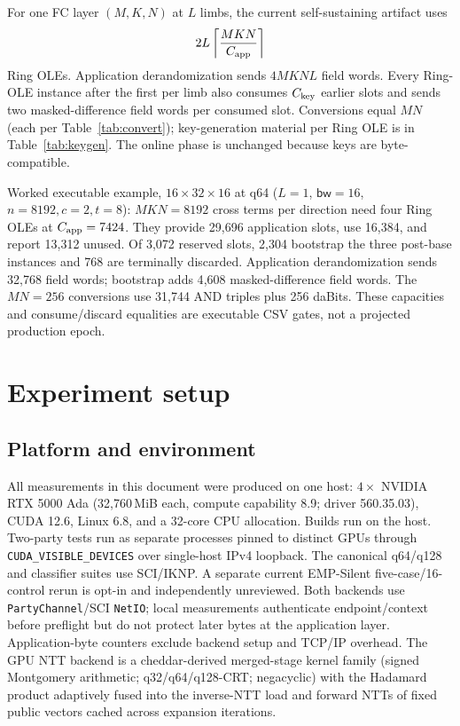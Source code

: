 \documentclass[11pt]{article}
\newcommand{\bw}{\mathsf{bw}}
\begin{document}
For one FC layer $(M,K,N)$ at $L$ limbs, the current self-sustaining artifact
uses
\[
2L\left\lceil\frac{MKN}{C_{\rm app}}\right\rceil
\]
Ring OLEs. Application derandomization sends $4MKNL$ field words. Every
Ring-OLE instance after the first per limb also consumes $C_{\rm key}$ earlier
slots and sends two masked-difference field words per consumed slot. Conversions
equal $MN$ (each per Table~\ref{tab:convert}); key-generation material per Ring
OLE is in Table~\ref{tab:keygen}. The online phase is unchanged because keys
are byte-compatible.

Worked executable example, $16{\times}32{\times}16$ at q64 ($L{=}1$,
$\bw{=}16$, $n{=}8192,c{=}2,t{=}8$): $MKN=8192$ cross terms per direction
need four Ring OLEs at $C_{\rm app}=7424$. They provide 29{,}696 application
slots, use 16{,}384, and report 13{,}312 unused. Of 3{,}072 reserved slots,
2{,}304 bootstrap the three post-base instances and 768 are terminally
discarded. Application derandomization sends 32{,}768 field words; bootstrap
adds 4{,}608 masked-difference field words. The $MN=256$ conversions use
31{,}744 AND triples plus 256 daBits. These capacities and consume/discard
equalities are executable CSV gates, not a projected production epoch.

\section{Experiment setup}
\label{sec:experiments}

\subsection{Platform and environment}
\label{sec:platform}

All measurements in this document were produced on one host: $4\times$ NVIDIA
RTX 5000 Ada (32{,}760\,MiB each, compute capability 8.9; driver 560.35.03),
CUDA 12.6, Linux 6.8, and a 32-core CPU allocation. Builds run on the host.
Two-party tests run as separate processes pinned to distinct GPUs through
\texttt{CUDA\_VISIBLE\_DEVICES} over single-host IPv4 loopback. The canonical
q64/q128 and classifier suites use SCI/IKNP. A separate current EMP-Silent
five-case/16-control rerun is opt-in and independently unreviewed. Both
backends use \texttt{PartyChannel}/SCI \texttt{NetIO}; local measurements
authenticate endpoint/context before preflight but do not protect later bytes
at the application layer. Application-byte counters exclude backend setup and
TCP/IP overhead.
The GPU NTT backend is a
cheddar-derived merged-stage kernel family (signed Montgomery arithmetic;
q32/q64/q128-CRT; negacyclic) with the Hadamard product adaptively fused into
the inverse-NTT load and forward NTTs of fixed public vectors cached across
expansion iterations.
\end{document}
